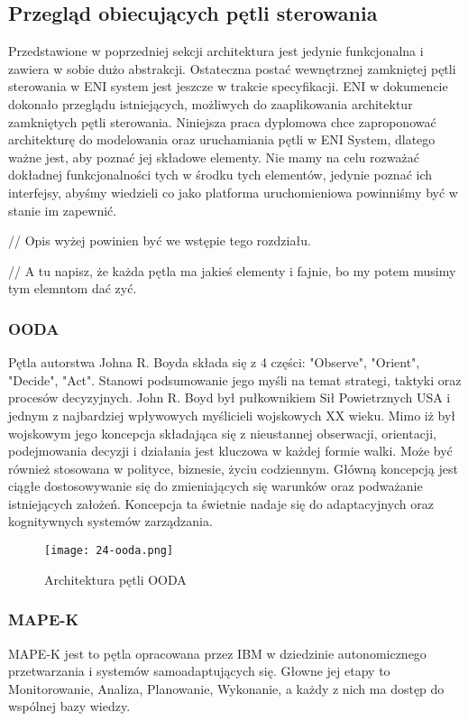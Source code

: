 \subsection{Przegląd obiecujących pętli sterowania}

Przedstawione w poprzedniej sekcji architektura jest jedynie funkcjonalna i zawiera w sobie dużo abstrakcji. Ostateczna postać wewnętrznej zamkniętej pętli sterowania w ENI system jest jeszcze w trakcie specyfikacji. ENI w dokumencie \cite{enioverview} dokonało przeglądu istniejących, możliwych do zaaplikowania architektur zamkniętych pętli sterowania. Niniejsza praca dyplomowa chce zaproponować architekturę do modelowania oraz uruchamiania pętli w ENI System, dlatego ważne jest, aby poznać jej składowe elementy. Nie mamy na celu rozważać dokładnej funkcjonalności tych w środku tych elementów, jedynie poznać ich interfejsy, abyśmy wiedzieli co jako platforma uruchomieniowa powinniśmy być w stanie im zapewnić. 

// Opis wyżej powinien być we wstępie tego rozdziału.

// A tu napisz, że każda pętla ma jakieś elementy i fajnie, bo my potem musimy tym elemntom dać zyć.

\subsubsection{OODA}
Pętla autorstwa Johna R. Boyda składa się z 4 części: "Observe", "Orient", "Decide", "Act". Stanowi podsumowanie jego myśli na temat strategi, taktyki oraz procesów decyzyjnych. John R. Boyd był pułkownikiem Sił Powietrznych USA i jednym z najbardziej wpływowych myślicieli wojskowych XX wieku. Mimo iż był wojskowym jego koncepcja składająca się z nieustannej obserwacji, orientacji, podejmowania decyzji i działania jest kluczowa w każdej formie walki. Może być również stosowana w polityce, biznesie, życiu codziennym. Główną koncepcją jest ciągłe dostosowywanie się do zmieniających się warunków oraz podważanie istniejących założeń. Koncepcja ta świetnie nadaje się do adaptacyjnych oraz kognitywnych systemów zarządzania.

\begin{figure}[!h]
    \centering \texttt{[image: 24-ooda.png]}
    \caption{Architektura pętli OODA}\label{fig:24-ooda}
\end{figure}


\subsubsection{MAPE-K}
MAPE-K jest to pętla opracowana przez IBM w dziedzinie autonomicznego przetwarzania i systemów samoadaptujących się. Głowne jej etapy to Monitorowanie, Analiza, Planowanie, Wykonanie, a każdy z nich ma dostęp do wspólnej bazy wiedzy. 

